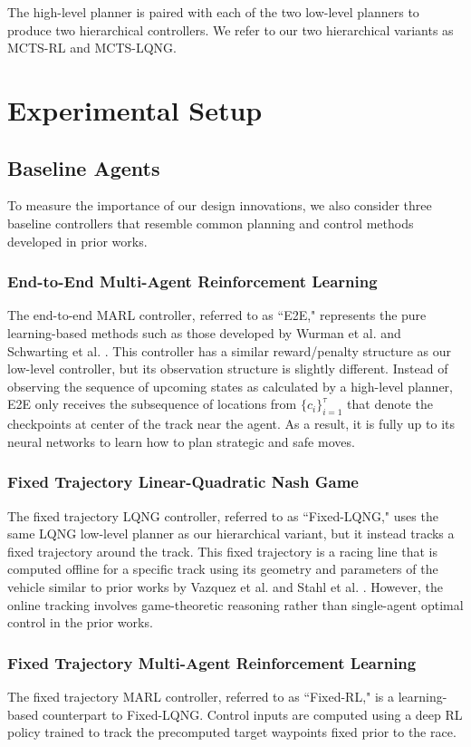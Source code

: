 The high-level planner is paired with each of the two low-level planners to produce two hierarchical controllers. We refer to our two hierarchical variants as MCTS-RL and MCTS-LQNG.

\section{Experimental Setup}
\subsection{Baseline Agents}
To measure the importance of our design innovations, we also consider three baseline controllers that resemble common planning and control methods developed in prior works.  
\subsubsection{End-to-End Multi-Agent Reinforcement Learning}
The end-to-end MARL controller, referred to as ``E2E," represents the pure learning-based methods such as those developed by Wurman et al. and Schwarting et al. \cite{sonyai, Schwarting2021}. This controller has a similar reward/penalty structure as our low-level controller, but its observation structure is slightly different. Instead of observing the sequence of upcoming states as calculated by a high-level planner, E2E only receives the subsequence of locations from $\{c_i\}_{i=1}^{\tau}$ that denote the checkpoints at center of the track near the agent. As a result, it is fully up to its neural networks to learn how to plan strategic and safe moves. 

\subsubsection{Fixed Trajectory Linear-Quadratic Nash Game}
The fixed trajectory LQNG controller, referred to as ``Fixed-LQNG," uses the same LQNG low-level planner as our hierarchical variant, but it instead tracks a fixed trajectory around the track. This fixed trajectory is a racing line that is computed offline for a specific track using its geometry and parameters of the vehicle similar to prior works by Vazquez et al. and Stahl et al. \cite{Vazquez2020, Stahl2019_2}. However, the online tracking involves game-theoretic reasoning rather than single-agent optimal control in the prior works.

\subsubsection{Fixed Trajectory Multi-Agent Reinforcement Learning}
The fixed trajectory MARL controller, referred to as ``Fixed-RL," is a learning-based counterpart to Fixed-LQNG. Control inputs are computed using a deep RL policy trained to track the precomputed target waypoints fixed prior to the race.  
